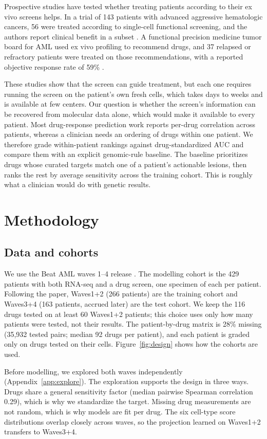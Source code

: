 \documentclass[11pt,logo,nonumbering]{preprint}
\begin{document}
Prospective studies have tested whether treating patients according to their ex vivo screens helps. In a trial of 143 patients with advanced aggressive hematologic cancers, 56 were treated according to single-cell functional screening, and the authors report clinical benefit in a subset \citep{kornauth2022}. A functional precision medicine tumor board for AML used ex vivo profiling to recommend drugs, and 37 relapsed or refractory patients were treated on those recommendations, with a reported objective response rate of 59\% \citep{malani2022}. 

These studies show that the screen can guide treatment, but each one requires running the screen on the patient's own fresh cells, which takes days to weeks and is available at few centers. Our question is whether the screen's information can be recovered from molecular data alone, which would make it available to every patient. Most drug-response prediction work reports per-drug correlation across patients, whereas a clinician needs an ordering of drugs within one patient. We therefore grade within-patient rankings against drug-standardized AUC and compare them with an explicit genomic-rule baseline. The baseline prioritizes drugs whose curated targets match one of a patient's actionable lesions, then ranks the rest by average sensitivity across the training cohort. This is roughly what a clinician would do with genetic results.

\section{Methodology}
\subsection{Data and cohorts}
We use the Beat AML waves 1--4 release \citep{bottomly2022}. The modelling cohort is the 429 patients with both RNA-seq and a drug screen, one specimen of each per patient. Following the paper, Waves1+2 (266 patients) are the training cohort and Waves3+4 (163 patients, accrued later) are the test cohort. We keep the 116 drugs tested on at least 60 Waves1+2 patients; this choice uses only how many patients were tested, not their results. The patient-by-drug matrix is 28\% missing (35{,}932 tested pairs; median 92 drugs per patient), and each patient is graded only on drugs tested on their cells. Figure~\ref{fig:design} shows how the cohorts are used.

Before modelling, we explored both waves independently (Appendix~\ref{app:explore}). The exploration supports the design in three ways. Drugs share a general sensitivity factor (median pairwise Spearman correlation 0.29), which is why we standardize the target. Missing drug measurements are not random, which is why models are fit per drug. The six cell-type score distributions overlap closely across waves, so the projection learned on Waves1+2 transfers to Waves3+4. 
\end{document}
